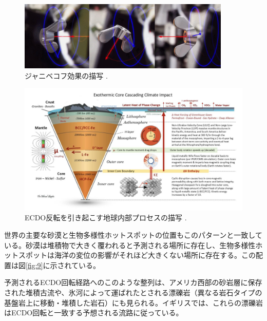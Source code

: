 \documentclass[10pt,twocolumn,letterpaper]{article}
\begin{document}
\begin{figure}[b]
\begin{center}
\includegraphics[width=0.9\textwidth]{dzhani.jpg}
\end{center}
   \caption{ジャニベコフ効果の描写 \cite{28}.}
\label{fig:10}
\end{figure}

\begin{figure}[b]
\begin{center}
\includegraphics[width=1\textwidth]{layers.jpg}
\end{center}

   \caption{ECDO反転を引き起こす地球内部プロセスの描写 \cite{129}.}
\label{fig:11}
\end{figure}

世界の主要な砂漠と生物多様性ホットスポットの位置もこのパターンと一致している。砂漠は堆積物で大きく覆われると予測される場所に存在し、生物多様性ホットスポットは海洋の変位の影響がそれほど大きくない場所に存在する\cite{28}。この配置は図\ref{fig:9}に示されている。

予測されるECDO回転経路へのこのような整列は、アメリカ西部の砂岩層に保存された堆積古流や、氷河によって運ばれたとされる漂礫岩（異なる岩石タイプの基盤岩上に移動・堆積した岩石）にも見られる\cite{21}。イギリスでは、これらの漂礫岩はECDO回転と一致する予想される流路に従っている\cite{67,68}。
\end{document}
